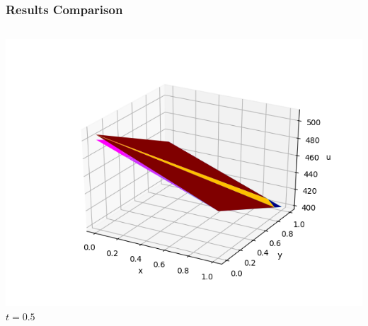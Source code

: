\documentclass[]{beamer}
\begin{document}
\begin{frame}[t]\frametitle{Results Comparison}
  	\begin{columns}
			\begin{center}
			\includegraphics[scale=0.17]{figures/2D_xy_ls1mat_u_vs_x_05}\\
			$t=0.5$
			
			\null
			

\end{center}
\end{columns}
\end{frame}
\end{document}
